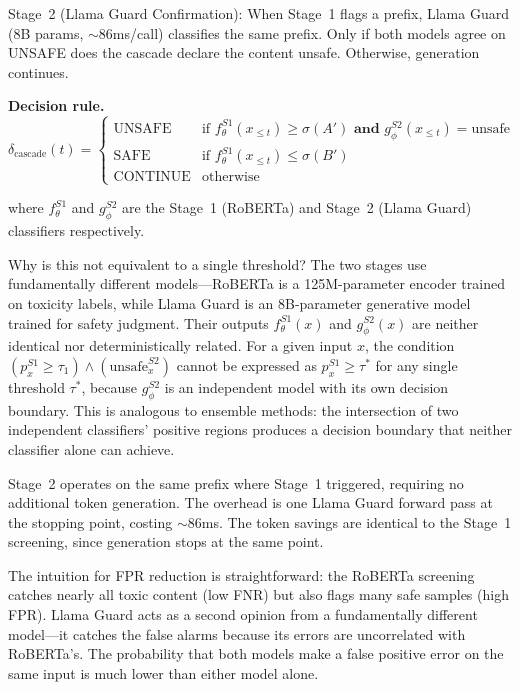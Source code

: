 \documentclass[acmtjournal, acmnowidth]{acmart}
\theoremstyle{definition}
\begin{document}
Stage~2 (Llama Guard Confirmation): When Stage~1 flags a prefix, Llama Guard (8B params, ${\sim}$86ms/call) classifies the same prefix. Only if both models agree on UNSAFE does the cascade declare the content unsafe. Otherwise, generation continues.

\textbf{Decision rule.}
\begin{equation}
\delta_{\text{cascade}}(t) = \begin{cases}
\text{UNSAFE} & \text{if } f^{S1}_\theta(x_{\leq t}) \geq \sigma(A') \textbf{ and } g^{S2}_\phi(x_{\leq t}) = \text{unsafe} \\
\text{SAFE} & \text{if } f^{S1}_\theta(x_{\leq t}) \leq \sigma(B') \\
\text{CONTINUE} & \text{otherwise}
\end{cases}
\label{eq:cascade_decision}
\end{equation}

where $f^{S1}_\theta$ and $g^{S2}_\phi$ are the Stage~1 (RoBERTa) and Stage~2 (Llama Guard) classifiers respectively.

Why is this not equivalent to a single threshold? The two stages use fundamentally different models---RoBERTa is a 125M-parameter encoder trained on toxicity labels, while Llama Guard is an 8B-parameter generative model trained for safety judgment. Their outputs $f^{S1}_\theta(x)$ and $g^{S2}_\phi(x)$ are neither identical nor deterministically related. For a given input $x$, the condition $(p^{S1}_x \geq \tau_1) \wedge (\text{unsafe}^{S2}_x)$ cannot be expressed as $p^{S1}_x \geq \tau^*$ for any single threshold $\tau^*$, because $g^{S2}_\phi$ is an independent model with its own decision boundary. This is analogous to ensemble methods: the intersection of two independent classifiers' positive regions produces a decision boundary that neither classifier alone can achieve.

Stage~2 operates on the same prefix where Stage~1 triggered, requiring no additional token generation. The overhead is one Llama Guard forward pass at the stopping point, costing ${\sim}$86ms. The token savings are identical to the Stage~1 screening, since generation stops at the same point.

The intuition for FPR reduction is straightforward: the RoBERTa screening catches nearly all toxic content (low FNR) but also flags many safe samples (high FPR). Llama Guard acts as a second opinion from a fundamentally different model---it catches the false alarms because its errors are uncorrelated with RoBERTa's. The probability that both models make a false positive error on the same input is much lower than either model alone.
\end{document}
